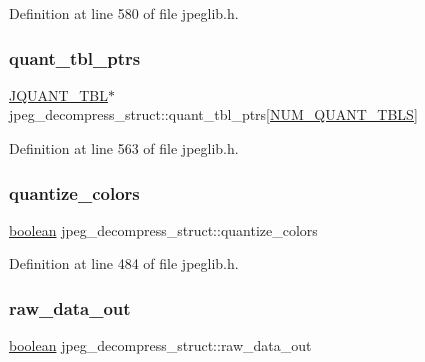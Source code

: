 Definition at line 580 of file jpeglib.\+h.

\mbox{\label{structjpeg__decompress__struct_a42be2e7197a38cf83e6cebbaac006ca6}} 
\subsubsection{\texorpdfstring{quant\_tbl\_ptrs}{quant\_tbl\_ptrs}}
{\footnotesize\ttfamily \mbox{\hyperlink{structJQUANT__TBL}{J\+Q\+U\+A\+N\+T\+\_\+\+T\+BL}}$\ast$ jpeg\+\_\+decompress\+\_\+struct\+::quant\+\_\+tbl\+\_\+ptrs\mbox{[}\mbox{\hyperlink{jpeglib_8h_ab3254a23612ea48615001fffc0c9f691}{N\+U\+M\+\_\+\+Q\+U\+A\+N\+T\+\_\+\+T\+B\+LS}}\mbox{]}}



Definition at line 563 of file jpeglib.\+h.

\mbox{\label{structjpeg__decompress__struct_a2eeeeb3b3dafd9aeaafd8fe6709763c8}} 
\subsubsection{\texorpdfstring{quantize\_colors}{quantize\_colors}}
{\footnotesize\ttfamily \mbox{\hyperlink{jmorecfg_8h_a7c6368b321bd9acd0149b030bb8275ed}{boolean}} jpeg\+\_\+decompress\+\_\+struct\+::quantize\+\_\+colors}



Definition at line 484 of file jpeglib.\+h.

\mbox{\label{structjpeg__decompress__struct_a5f2c59e52598e7ef8dd2cd76dd99f9cf}} 
\subsubsection{\texorpdfstring{raw\_data\_out}{raw\_data\_out}}
{\footnotesize\ttfamily \mbox{\hyperlink{jmorecfg_8h_a7c6368b321bd9acd0149b030bb8275ed}{boolean}} jpeg\+\_\+decompress\+\_\+struct\+::raw\+\_\+data\+\_\+out}



